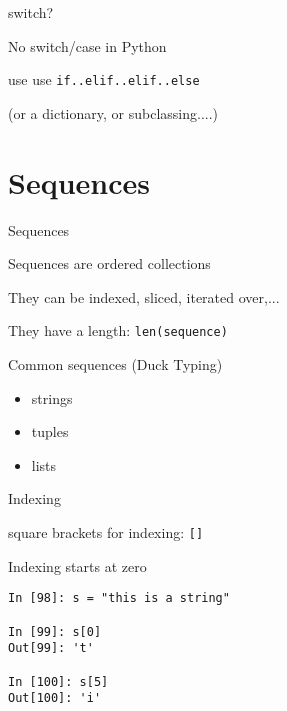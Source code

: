 \documentclass{beamer}
\begin{document}
\begin{frame}[fragile]{switch?}

\vfill
{\Large No switch/case in Python}

\vfill
{\Large use use \verb|if..elif..elif..else|}

\vfill

(or a dictionary, or subclassing....)
\end{frame}

%
%
%
%
%

\section {Sequences}

\begin{frame}[fragile]{Sequences}

{\Large Sequences are ordered collections}

\vfill
{\Large They can be indexed, sliced, iterated over,...}

\vfill
{\Large They have a length:  \verb+len(sequence)+}

\vfill
{\Large Common sequences (Duck Typing)}

\begin{itemize}
   \item strings
   \item tuples
   \item lists
\end{itemize}

\end{frame}

\begin{frame}[fragile]{Indexing}

{\Large square brackets for indexing: \verb+[]+}

\vfill
{\Large Indexing starts at zero}

\begin{verbatim}
In [98]: s = "this is a string"

In [99]: s[0]
Out[99]: 't'

In [100]: s[5]
Out[100]: 'i'
\end{verbatim}

\end{frame}
\end{document}
